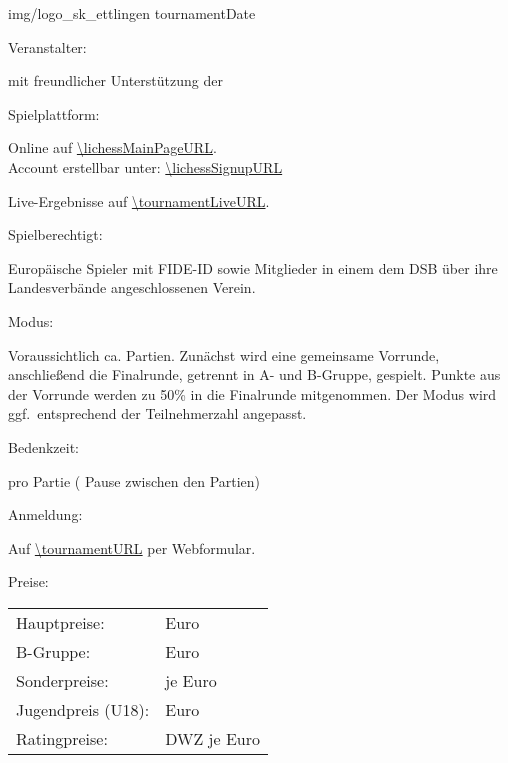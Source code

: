 \documentclass[paper=a4, fontsize=10pt]{scrartcl}
\begin{document}
                 {img/logo_sk_ettlingen}
                 {\tournamentName}
                 {tournamentDate}


\begin{basedescript}{\desclabelstyle{\multilinelabel}\desclabelwidth{10em}}


\item[Veranstalter:]
  
  \organizerName{} mit freundlicher Unterstützung der \sponsorName{}

\item[Spielplattform:]

  Online auf \url{\lichessMainPageURL}. \\
  Account erstellbar unter: \url{\lichessSignupURL}

  Live-Ergebnisse auf \url{\tournamentLiveURL}.

\item[Spielberechtigt:]

  Europäische Spieler mit FIDE-ID sowie Mitglieder in einem dem DSB
  über ihre Landesverbände angeschlossenen Verein.

\item[Modus:]

  Voraussichtlich ca. \expectedTotalGames{} Partien. Zunächst wird
  eine gemeinsame Vorrunde, anschließend die Finalrunde, getrennt in
  A- und B-Gruppe, gespielt. Punkte aus der Vorrunde werden zu 50\% in
  die Finalrunde mitgenommen. Der Modus wird ggf.\ entsprechend der
  Teilnehmerzahl angepasst.

\item[Bedenkzeit:]

  \timePerGame{} pro Partie (\pauseBetweenGames{} Pause zwischen den
  Partien)

\item[Anmeldung:]

  Auf \url{\tournamentURL} per Webformular.

\item[Preise:]

  \hspace{2em}\begin{tabular}[t]{ll}
    Hauptpreise:       &  \is{/}{\prizesTournamentA} Euro \\
    B-Gruppe:          &  \is{/}{\prizesTournamentB} Euro \\
    Sonderpreise:      &  \is{/}{\specialPrizesCateries} je \specialPrizes{} Euro \\
    Jugendpreis (U18): &  \is{/}{\youthPrizes} Euro \\
    Ratingpreise:      &  DWZ \is{/}{\ratingPriceCategories} je \ratingPrices{} Euro
  \end{tabular}


\end{basedescript}
\end{document}
